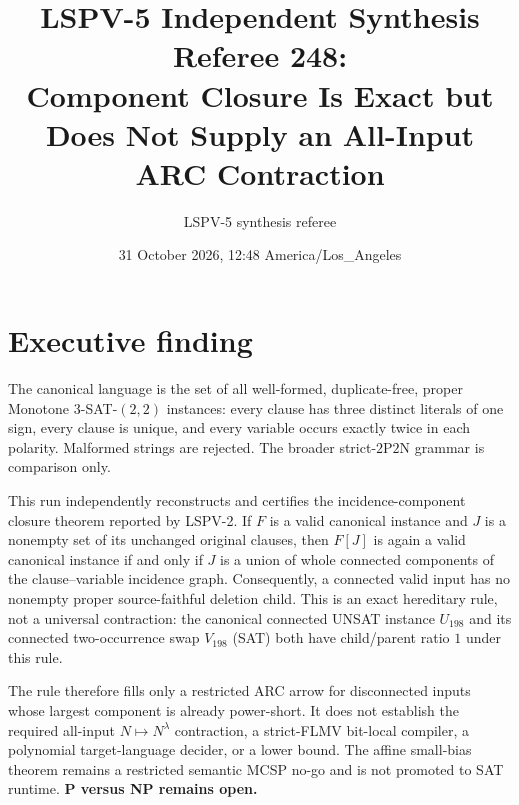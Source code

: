 \documentclass[11pt]{article}
\title{LSPV-5 Independent Synthesis Referee 248:\\
Component Closure Is Exact but Does Not Supply an All-Input ARC Contraction}
\author{LSPV-5 synthesis referee}
\date{31 October 2026, 12:48 America/Los\_Angeles}
\begin{document}
\maketitle

\section*{Executive finding}
The canonical language is the set of all well-formed, duplicate-free, proper
Monotone $3$-SAT-$(2,2)$ instances: every clause has three distinct literals of
one sign, every clause is unique, and every variable occurs exactly twice in
each polarity.  Malformed strings are rejected.  The broader strict-$2$P$2$N
grammar is comparison only.

This run independently reconstructs and certifies the incidence-component
closure theorem reported by LSPV-2.  If $F$ is a valid canonical instance and
$J$ is a nonempty set of its unchanged original clauses, then $F[J]$ is again a
valid canonical instance if and only if $J$ is a union of whole connected
components of the clause--variable incidence graph.  Consequently, a connected
valid input has no nonempty proper source-faithful deletion child.  This is an
exact hereditary rule, not a universal contraction: the canonical connected
UNSAT instance $U_{198}$ and its connected two-occurrence swap $V_{198}$ (SAT)
both have child/parent ratio $1$ under this rule.

The rule therefore fills only a restricted ARC arrow for disconnected inputs
whose largest component is already power-short.  It does not establish the
required all-input $N\mapsto N^\lambda$ contraction, a strict-FLMV bit-local
compiler, a polynomial target-language decider, or a lower bound.  The affine
small-bias theorem remains a restricted semantic MCSP no-go and is not promoted
to SAT runtime.  \textbf{P versus NP remains open.}
\end{document}
